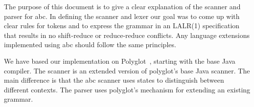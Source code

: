 The purpose of this document is to give a clear explanation of the scanner
and parser for abc.    In defining the scanner and lexer our goal was to
come up with clear rules for tokens and to express the grammar in an
LALR(1) specification that results in no shift-reduce or reduce-reduce
conflicts.   Any language extensions implemented using abc should follow
the same principles.

We have based our implementation on Polyglot~\cite{Nystrom:2003:PEC}, 
starting with the base Java compiler.   The scanner is an extended version
of polyglot's base Java scanner.   The main difference is that the abc
scanner uses states to distinguish between different contexts.  The parser
uses polyglot's mechanism for extending an existing grammar.

